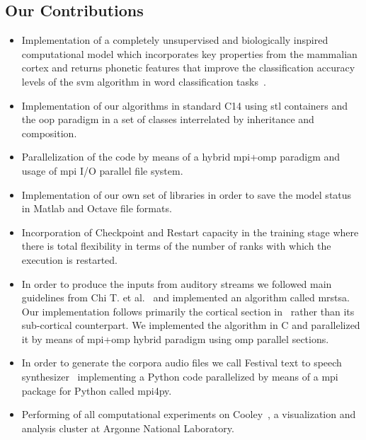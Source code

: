 \documentclass[11pt,a4paper]{article}
\newcommand{\CC}{C\nolinebreak\hspace{-.05em}\raisebox{.4ex}{\tiny\bf +}\nolinebreak\hspace{-.10em}\raisebox{.4ex}{\tiny\bf +}}
\begin{document}





\subsection{Our Contributions}

\begin{itemize}

\item Implementation of a completely unsupervised and biologically inspired computational model which incorporates key properties from the mammalian cortex and returns phonetic features that improve the classification accuracy levels of the \gls{svm} algorithm in word classification tasks~\cite{Dematties2018}.

\item Implementation of our algorithms in standard \CC14 using \gls{stl} containers and the \gls{oop} paradigm in a set of classes interrelated by inheritance and composition.
\item Parallelization of the code by means of a hybrid \gls{mpi}+\gls{omp} paradigm and usage of \gls{mpi} I/O parallel file system.
\item Implementation of our own set of libraries in order to save the model status in Matlab and Octave file formats. 
\item Incorporation of Checkpoint and Restart capacity in the training stage where there is total flexibility in terms of the number of ranks with which the execution is restarted.
\item In order to produce the inputs from auditory streams we followed main guidelines from Chi T. et al.~\cite{chi_2005} and implemented an algorithm called \gls{mrstsa}. Our implementation follows primarily the cortical section in~\cite{chi_2005} rather than its sub-cortical counterpart. We implemented the algorithm in C and parallelized it by means of \gls{mpi}+\gls{omp} hybrid paradigm using \gls{omp} parallel sections.
\item In order to generate the corpora audio files we call Festival text to speech synthesizer~\cite{festival2014} implementing a Python code parallelized by means of a \gls{mpi} package for Python called mpi4py.
\item Performing of all computational experiments on Cooley~\cite{noauthor_cooley_nodate}, a visualization and analysis cluster at Argonne National Laboratory.


\end{itemize}
\end{document}

